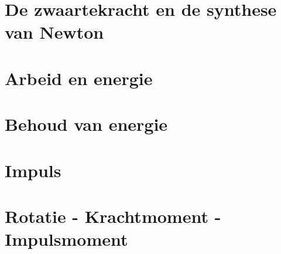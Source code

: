\documentclass{exam}
\begin{document}
\newpage

\section{De zwaartekracht en de synthese van Newton}

\vspace{0.5cm}



\newpage

\section{Arbeid en energie}

\vspace{0.5cm}



\newpage

\section{Behoud van energie}

\vspace{0.5cm}



\newpage

\section{Impuls}

\vspace{0.5cm}



\newpage

\section{Rotatie - Krachtmoment - Impulsmoment}

\vspace{0.5cm}



\newpage

\end{document}
